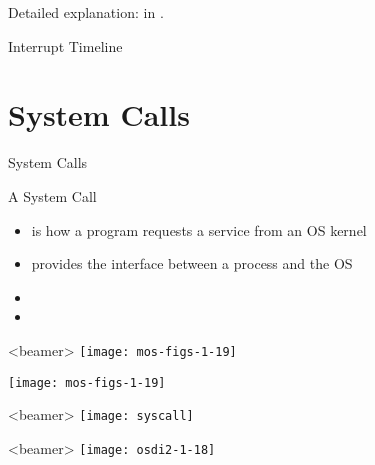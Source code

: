 Detailed explanation: in .

\begin{frame}{Interrupt Timeline}
  \begin{center}
  \end{center}
\end{frame}

\section{System Calls}
\label{sec:system-calls}


\begin{frame}{System Calls}
  \begin{block}{A System Call}
    \begin{itemize}
    \item is how a program requests a service from an OS kernel
    \item provides the interface between a process and the OS
    \end{itemize}
  \end{block}
  \begin{itemize}
  \item[] 
  \item[] 
  \end{itemize}
\end{frame}

\begin{frame}<beamer>
  \centering\texttt{[image: mos-figs-1-19]}
\end{frame}

\begin{center}
  \texttt{[image: mos-figs-1-19]}
\end{center}

\begin{frame}<beamer>
  \centering\texttt{[image: syscall]}
\end{frame}

\begin{frame}<beamer>
  \centering\texttt{[image: osdi2-1-18]}
\end{frame}

